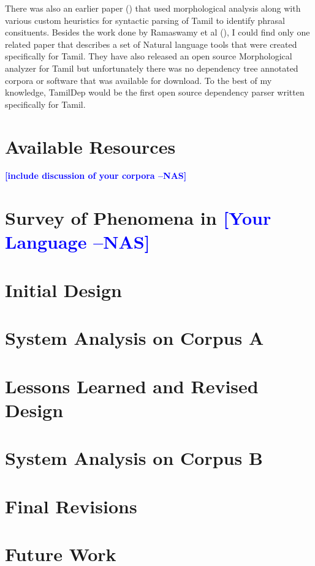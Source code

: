 \documentclass[11pt,letterpaper]{article}
\newcommand{\nascomment}[1]{\textcolor{blue}{\textbf{[#1 --NAS]}}}
\begin{document}
There was also an earlier paper (\cite{dhanalakshmi2010natural}) that used morphological analysis along with various custom heuristics for syntactic parsing
of Tamil to identify phrasal consituents. Besides the work done by Ramaswamy et al (\cite{ramasamy2011tamil}), I could find only one related paper that describes
a set of Natural language tools that were created specifically for Tamil. They have also released an open source Morphological analyzer
for Tamil but unfortunately there was no dependency tree annotated corpora or software that was available for download. To the best of my knowledge, TamilDep would be 
the first open source dependency parser written specifically for Tamil. 


\section{Available Resources}

\nascomment{include discussion of your corpora}

\section{Survey of Phenomena in \nascomment{Your Language}}

\section{Initial Design}

\section{System Analysis on Corpus A}

\section{Lessons Learned and Revised Design}

\section{System Analysis on Corpus B}

\section{Final Revisions}

\section{Future Work}




\label{lastpage}
\end{document}
